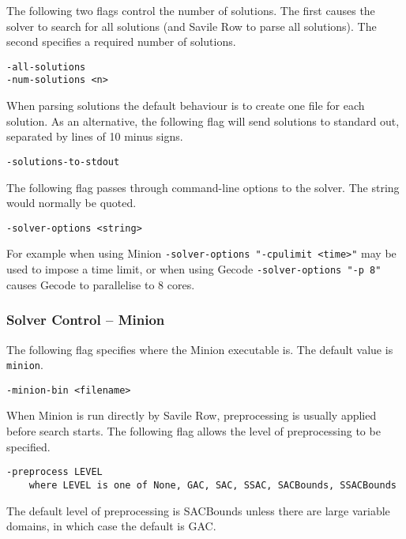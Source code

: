 \documentclass[a4paper]{article}
\newcommand{\savilerow}{{\sc Savile Row}\xspace}
\begin{document}
The following two flags control the number of solutions. 
The first causes the solver to search for
all solutions (and \savilerow to parse all solutions). The second specifies a 
required number of solutions. 

\begin{verbatim}
-all-solutions
-num-solutions <n>
\end{verbatim}

When parsing solutions the default behaviour is to create one file 
for each solution. As an alternative, the following flag will send solutions 
to standard out, separated by lines of 10 minus signs. 

\begin{verbatim}
-solutions-to-stdout
\end{verbatim}

The following flag passes through command-line options to the solver. The string
would normally be quoted. 

\begin{verbatim}
-solver-options <string>
\end{verbatim}

For example when using Minion \texttt{-solver-options "-cpulimit <time>"} may
be used to impose a time limit, or when using Gecode \texttt{-solver-options "-p 8"}
causes Gecode to parallelise to 8 cores. 

\subsubsection{Solver Control -- Minion}

The following flag specifies where the Minion executable is. The default value
is \texttt{minion}. 

\begin{verbatim}
-minion-bin <filename>
\end{verbatim}

When Minion is run directly by \savilerow, preprocessing is usually 
applied before search starts. The following flag allows the level of 
preprocessing to be specified. 

\begin{verbatim}
-preprocess LEVEL 
    where LEVEL is one of None, GAC, SAC, SSAC, SACBounds, SSACBounds
\end{verbatim}

The default level of preprocessing is SACBounds unless there are large
variable domains, in which case the default is GAC. 
\end{document}
